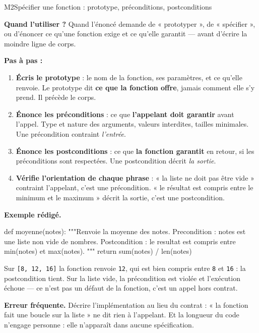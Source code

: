 \begin{fichemethode}{M2}{Spécifier une fonction : prototype, préconditions, postconditions}

\textbf{Quand l'utiliser ?} Quand l'énoncé demande de « prototyper », de « spécifier », ou
d'énoncer ce qu'une fonction exige et ce qu'elle garantit — avant d'écrire la moindre ligne
de corps.

\textbf{Pas à pas :}
\begin{enumerate}
  \item \textbf{Écris le prototype} : le nom de la fonction, ses paramètres, et ce qu'elle
        renvoie. Le prototype dit \textbf{ce que la fonction offre}, jamais comment elle s'y
        prend. Il précède le corps.
  \item \textbf{Énonce les préconditions} : ce que \textbf{l'appelant doit garantir} avant
        l'appel. Type et nature des arguments, valeurs interdites, tailles minimales.
        Une précondition contraint \emph{l'entrée}.
  \item \textbf{Énonce les postconditions} : ce que \textbf{la fonction garantit} en retour,
        si les préconditions sont respectées. Une postcondition décrit \emph{la sortie}.
  \item \textbf{Vérifie l'orientation de chaque phrase} : « la liste ne doit pas être vide »
        contraint l'appelant, c'est une précondition. « le résultat est compris entre le
        minimum et le maximum » décrit la sortie, c'est une postcondition.
\end{enumerate}

\textbf{Exemple rédigé.}

\begin{python}
def moyenne(notes):
    """Renvoie la moyenne des notes.
    Precondition : notes est une liste non vide de nombres.
    Postcondition : le resultat est compris entre min(notes) et max(notes).
    """
    return sum(notes) / len(notes)
\end{python}

Sur \lstinline{[8, 12, 16]} la fonction renvoie \lstinline{12}, qui est bien compris entre
\lstinline{8} et \lstinline{16} : la postcondition tient. Sur la liste vide, la précondition
est violée et l'exécution échoue — ce n'est pas un défaut de la fonction, c'est un appel
hors contrat.

\textbf{Erreur fréquente.} Décrire l'implémentation au lieu du contrat : « la fonction fait une
boucle sur la liste » ne dit rien à l'appelant. Et la longueur du code n'engage personne : elle
n'apparaît dans aucune spécification.

\end{fichemethode}
